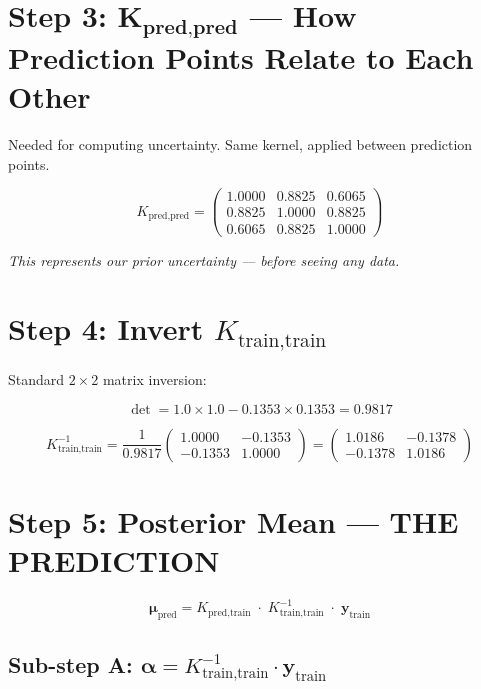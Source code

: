 \documentclass[11pt, a4paper]{article}
\newcommand{\note}[1]{{\small\color{notegreen}\textit{#1}}}
\begin{document}
\section*{\color{secblue}Step 3: $\mathbf{K_{\text{pred,pred}}}$ — How Prediction Points Relate to Each Other}

Needed for computing uncertainty. Same kernel, applied between prediction points.

\[
K_{\text{pred,pred}} =
\begin{pmatrix}
1.0000 & 0.8825 & 0.6065 \\
0.8825 & 1.0000 & 0.8825 \\
0.6065 & 0.8825 & 1.0000
\end{pmatrix}
\]

\note{This represents our prior uncertainty — before seeing any data.}


\section*{\color{secblue}Step 4: Invert $K_{\text{train,train}}$}

Standard $2\times 2$ matrix inversion:

\[
\det = 1.0 \times 1.0 - 0.1353 \times 0.1353 = 0.9817
\]

\[
K_{\text{train,train}}^{-1} = \frac{1}{0.9817}
\begin{pmatrix} 1.0000 & -0.1353 \\ -0.1353 & 1.0000 \end{pmatrix}
=
\begin{pmatrix} 1.0186 & -0.1378 \\ -0.1378 & 1.0186 \end{pmatrix}
\]


\section*{\color{secblue}Step 5: Posterior Mean — THE PREDICTION}

\[
\boldsymbol{\mu}_{\text{pred}} = K_{\text{pred,train}} \;\cdot\; K_{\text{train,train}}^{-1} \;\cdot\; \mathbf{y}_{\text{train}}
\]

\subsection*{Sub-step A: $\boldsymbol{\alpha} = K_{\text{train,train}}^{-1} \cdot \mathbf{y}_{\text{train}}$}
\end{document}
